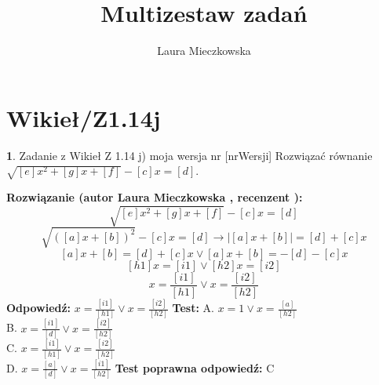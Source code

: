 \documentclass[12pt, a4paper]{article}
\title{Multizestaw zadań}
\author{Laura Mieczkowska}
\date{}
\theoremstyle{definition} %
\newtheorem{zad}{}
\newcommand{\kategoria}[1]{\section{#1}} %
\newcommand{\zadStart}[1]{\begin{zad}#1\newline} %
\newcommand{\zadStop}{\end{zad}}   %
\newcommand{\rozwStart}[2]{\noindent \textbf{Rozwiązanie (autor #1 , recenzent #2): }\newline} %
\newcommand{\odpStart}{\noindent \textbf{Odpowiedź:}\newline}    %
\newcommand{\odpStop}{\newline}                                             %
\newcommand{\testStart}{\noindent \textbf{Test:}\newline} %
\newcommand{\testStop}{\newline} %
\newcommand{\kluczStart}{\noindent \textbf{Test poprawna odpowiedź:}\newline} %
\newcommand{\kluczStop}{\newline} %
\begin{document}
\maketitle


\kategoria{Wikieł/Z1.14j}
\zadStart{Zadanie z Wikieł Z 1.14 j) moja wersja nr [nrWersji]}
Rozwiązać równanie $\sqrt{[e]x^2+[g]x+[f]}-[c]x=[d]$.
\zadStop
\rozwStart{Laura Mieczkowska}{}
$$\sqrt{[e]x^2+[g]x+[f]}-[c]x=[d]$$ 
$$\sqrt{([a]x+[b])^2}-[c]x=[d]\rightarrow |[a]x+[b]|=[d]+[c]x$$
$$[a]x+[b]=[d]+[c]x \vee [a]x+[b]=-[d]-[c]x$$
$$[h1]x=[i1] \vee [h2]x=[i2]$$
$$x=\frac{[i1]}{[h1]} \vee x=\frac{[i2]}{[h2]}$$
\odpStart
$x=\frac{[i1]}{[h1]} \vee x=\frac{[i2]}{[h2]}$
\odpStop
\testStart
A. $x=1 \vee x=\frac{[a]}{[h2]}$ \\
B. $x=\frac{[i1]}{[d]} \vee x=\frac{[i2]}{[h2]}$ \\
C. $x=\frac{[i1]}{[h1]} \vee x=\frac{[i2]}{[h2]}$ \\
D. $x=\frac{[a]}{[d]} \vee x=\frac{[i1]}{[h2]}$ 
\testStop
\kluczStart
C
\kluczStop
\end{document}
